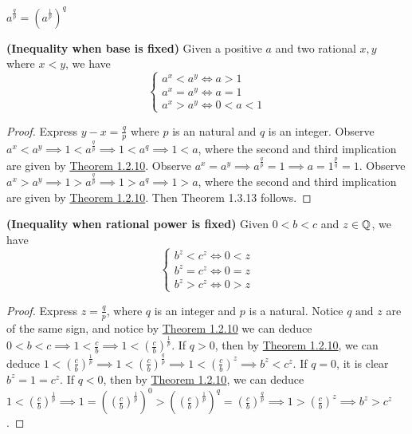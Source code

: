 \documentclass{report}
\begin{document}
\begin{corollary}
$a^{\frac{q}{p}}=(a^{\frac{1}{p}})^q$
\end{corollary}
\begin{theorem}
\textbf{(Inequality when base is fixed)} Given a positive $a$ and two rational  $x,y$ where  $x<y$, we have
 \begin{equation}
\begin{cases}
  a^x<a^y\iff a>1\\
  a^x=a^y\iff a=1\\
  a^x>a^y\iff 0<a<1
\end{cases}
\end{equation}
\end{theorem}
\begin{proof}
  Express $y-x=\frac{q}{p}$ where $p$ is an natural and $q$ is an integer. Observe $a^x<a^y\implies 1<a^{\frac{q}{p}}\implies 1<a^q\implies 1<a$, where the second and third implication are given by \hyperref[1.2.10]{Theorem 1.2.10}. Observe $a^x=a^y\implies a^{\frac{q}{p}}=1\implies a=1^{\frac{p}{q}}=1$. Observe $a^x>a^y\implies 1>a^{\frac{q}{p}}\implies 1>a^q\implies 1>a$, where the second and third implication are given by \hyperref[1.2.10]{Theorem 1.2.10}. Then Theorem 1.3.13 follows.  
\end{proof}
\begin{theorem}
\textbf{(Inequality when rational power is fixed)} Given $0<b<c$ and  $z\in\mathbb{Q}$, we have
\begin{equation}
\begin{cases}
  b^z<c^z \iff 0<z\\
  b^z=c^z \iff 0=z\\
  b^z>c^z\iff 0>z
\end{cases}
\end{equation}
\end{theorem}
\begin{proof}
Express $z=\frac{q}{p}$, where $q$ is an integer and $p$ is a natural. Notice $q\text{ and }z$ are of the same sign, and notice by \hyperref[1.2.10]{Theorem 1.2.10} we can deduce $0<b<c\implies 1<\frac{c}{b}\implies 1<(\frac{c}{b})^{\frac{1}{p}}$. If $q>0$, then by \hyperref[1.2.10]{Theorem 1.2.10}, we can deduce $1<(\frac{c}{b})^{\frac{1}{p}}\implies 1<(\frac{c}{b})^{\frac{q}{p}}\implies 1<(\frac{c}{b})^z\implies b^z<c^z$. If $q=0$, it is clear  $b^z=1=c^z$. If $q<0$, then by \hyperref[1.2.10]{Theorem 1.2.10}, we can deduce $ 1<(\frac{c}{b})^{\frac{1}{p}}\implies 1=((\frac{c}{b})^{\frac{1}{p}})^0 >((\frac{c}{b})^{\frac{1}{p}})^q=(\frac{c}{b})^{\frac{q}{p}}\implies 1>(\frac{c}{b})^z\implies b^z>c^z$. 
\end{proof}
\end{document}
